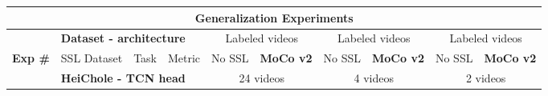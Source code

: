 \documentclass[times,twocolumn,final]{elsarticle}
\begin{document}
\begin{table*}[]
\centering
\begin{tabular}{llllcccccc}
\hline
\multicolumn{10}{c}{\textbf{Generalization Experiments}}\\\hline
\multicolumn{1}{c}{} & \multicolumn{3}{l}{\textbf{Dataset - architecture}} & \multicolumn{2}{c}{Labeled videos}    & \multicolumn{2}{c}{Labeled videos}        & \multicolumn{2}{c}{Labeled videos}       \\
\multicolumn{1}{c}{\multirow{-2}{*}{\textbf{Exp \#}}} & \cellcolor[HTML]{C0C0C0}SSL Dataset & \cellcolor[HTML]{00D2CB}Task         & \multicolumn{1}{r}{\cellcolor[HTML]{FFCCC9}Metric} & No SSL               & \textbf{MoCo v2}     & No SSL               & \textbf{MoCo v2}        & No SSL               & \textbf{MoCo v2}        \\\hline
& \multicolumn{3}{l}{\textbf{HeiChole - TCN head}} & \multicolumn{2}{c}{24 videos} & \multicolumn{2}{c}{4 videos}    & \multicolumn{2}{c}{2 videos}\\
                                                      

\end{tabular}
\end{table*}
\end{document}
